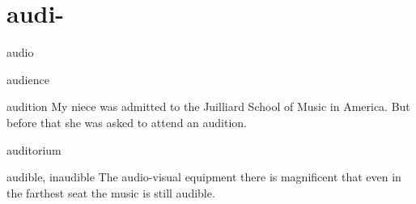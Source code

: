 \chapter{audi-}

\begin{word}{audio}
\end{word}

\begin{word}{audience}
\end{word}

\begin{word}{audition} 
    My  niece  was admitted  to  the Juilliard School of Music  in  America. But before that she was asked to attend an audition.
\end{word}

\begin{word}{auditorium}
\end{word}

\begin{word}{audible, inaudible}
    The audio-visual equipment there  is  magnificent that even  in the  farthest seat the music is still audible.
\end{word}

